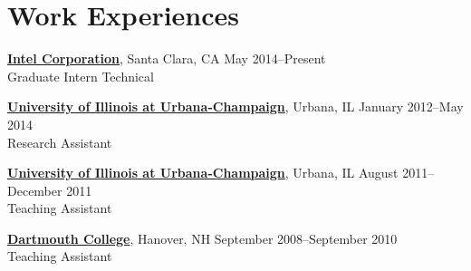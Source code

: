 \section{\sc Work Experiences}
{\href{http://www.intel.com/}{{\bf Intel Corporation}}}, Santa Clara, CA \hfill May 2014--Present\\
Graduate Intern Technical

{\href{http://www.illinois.edu/}{{\bf University of Illinois at Urbana-Champaign}}}, Urbana, IL \hfill January 2012--May 2014\\
Research Assistant

{\href{http://www.illinois.edu/}{{\bf University of Illinois at Urbana-Champaign}}}, Urbana, IL \hfill August 2011--December 2011\\
Teaching Assistant

{\href{http://www.dartmouth.edu/}{{\bf Dartmouth College}}}, Hanover, NH \hfill September 2008--September 2010\\
Teaching Assistant
